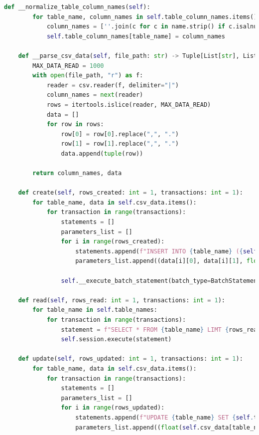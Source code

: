 \begin{lstlisting}[language=Python, caption=CassandraDatabaseTesting]
    def __normalize_table_column_names(self):
        for table_name, column_names in self.table_column_names.items():
            column_names = [''.join(c for c in name.strip() if c.isalnum() or c == '_') for name in column_names]
            self.table_column_names[table_name] = column_names

    def __parse_csv_data(self, file_path: str) -> Tuple[List[str], List[Tuple[str, str, float, int]]]:
        MAX_DATA_READ = 1000
        with open(file_path, "r") as f:
            reader = csv.reader(f, delimiter="|")
            column_names = next(reader)
            rows = itertools.islice(reader, MAX_DATA_READ)
            data = []
            for row in rows:
                row[0] = row[0].replace(",", ".")
                row[1] = row[1].replace(",", ".")
                data.append(tuple(row))

        return column_names, data

    def create(self, rows_created: int = 1, transactions: int = 1):
        for table_name, data in self.csv_data.items():
            for transaction in range(transactions):
                statements = []
                parameters_list = []
                for i in range(rows_created):
                    statements.append(f"INSERT INTO {table_name} ({self.table_column_names[table_name][0]}, {self.table_column_names[table_name][1]}, {self.table_column_names[table_name][2]}, {self.table_column_names[table_name][3]}) VALUES (%s, %s, %s, %s)")
                    parameters_list.append((data[i][0], data[i][1], float(data[i][2]), int(data[i][3])))

                self.__execute_batch_statement(batch_type=BatchStatement.Type.UNLOGGED, statements=statements, parameters_list=parameters_list)

    def read(self, rows_read: int = 1, transactions: int = 1):
        for table_name in self.table_names:
            for transaction in range(transactions):
                statement = f"SELECT * FROM {table_name} LIMT {rows_read}"
                self.session.execute(statement)

    def update(self, rows_updated: int = 1, transactions: int = 1):
        for table_name, data in self.csv_data.items():
            for transaction in range(transactions):
                statements = []
                parameters_list = []
                for i in range(rows_updated):
                    statements.append(f"UPDATE {table_name} SET {self.table_column_names[table_name][2]} = %s WHERE {self.table_column_names[table_name][0]} = %s AND {self.table_column_names[table_name][1]} = %s")
                    parameters_list.append((float(self.csv_data[table_name][i][2]), self.csv_data[table_name][i][0], self.csv_data[table_name][i][1]))


\end{lstlisting}
